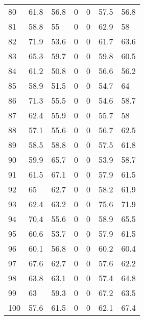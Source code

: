 \begin{longtable}{lllllll}
80  & 61.8 & 56.8 & 0       & 0       & 57.5 & 56.8 \\
81  & 58.8 & 55   & 0       & 0       & 62.9 & 58   \\
82  & 71.9 & 53.6 & 0       & 0       & 61.7 & 63.6 \\
83  & 65.3 & 59.7 & 0       & 0       & 59.8 & 60.5 \\
84  & 61.2 & 50.8 & 0       & 0       & 56.6 & 56.2 \\
85  & 58.9 & 51.5 & 0       & 0       & 54.7 & 64   \\
86  & 71.3 & 55.5 & 0       & 0       & 54.6 & 58.7 \\
87  & 62.4 & 55.9 & 0       & 0       & 55.7 & 58   \\
88  & 57.1 & 55.6 & 0       & 0       & 56.7 & 62.5 \\
89  & 58.5 & 58.8 & 0       & 0       & 57.5 & 61.8 \\
90  & 59.9 & 65.7 & 0       & 0       & 53.9 & 58.7 \\
91  & 61.5 & 67.1 & 0       & 0       & 57.9 & 61.5 \\
92  & 65   & 62.7 & 0       & 0       & 58.2 & 61.9 \\
93  & 62.4 & 63.2 & 0       & 0       & 75.6 & 71.9 \\
94  & 70.4 & 55.6 & 0       & 0       & 58.9 & 65.5 \\
95  & 60.6 & 53.7 & 0       & 0       & 57.9 & 61.5 \\
96  & 60.1 & 56.8 & 0       & 0       & 60.2 & 60.4 \\
97  & 67.6 & 62.7 & 0       & 0       & 57.6 & 62.2 \\
98  & 63.8 & 63.1 & 0       & 0       & 57.4 & 64.8 \\
99  & 63   & 59.3 & 0       & 0       & 67.2 & 63.5 \\
100 & 57.6 & 61.5 & 0       & 0       & 62.1 & 67.4 \\
\bottomrule

\end{longtable}
